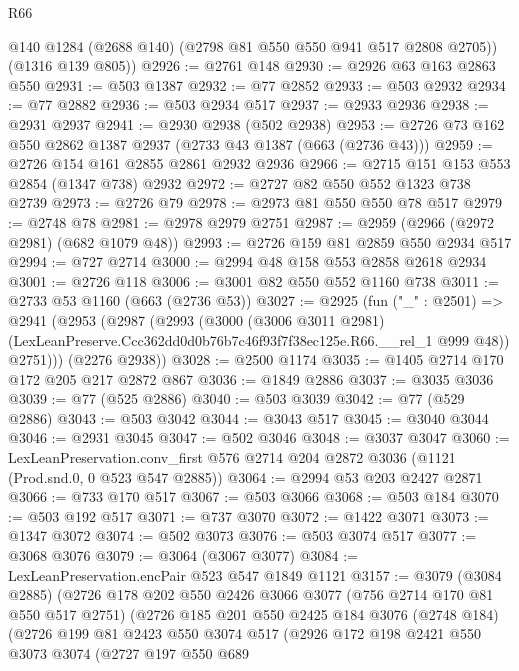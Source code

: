 \begin{lexlean}{R66}
\begin{coremodule}
        @140
        @1284
        (@2688 @140)
        (@2798 @81 @550 @550 @941 @517 @2808 @2705))
      (@1316 @139 @805))
@2926 := @2761 @148
@2930 := @2926 @63 @163 @2863 @550
@2931 := @503 @1387
@2932 := @77 @2852
@2933 := @503 @2932
@2934 := @77 @2882
@2936 := @503 @2934 @517
@2937 := @2933 @2936
@2938 := @2931 @2937
@2941 := @2930 @2938 (@502 @2938)
@2953 := @2726 @73 @162 @550 @2862 @1387 @2937 (@2733 @43 @1387 (@663 (@2736 @43)))
@2959 := @2726 @154 @161 @2855 @2861 @2932 @2936
@2966 := @2715 @151 @153 @553 @2854 (@1347 @738) @2932
@2972 := @2727 @82 @550 @552 @1323 @738 @2739
@2973 := @2726 @79
@2978 := @2973 @81 @550 @550 @78 @517
@2979 := @2748 @78
@2981 := @2978 @2979 @2751
@2987 := @2959 (@2966 (@2972 @2981) (@682 @1079 @48))
@2993 := @2726 @159 @81 @2859 @550 @2934 @517
@2994 := @727 @2714
@3000 := @2994 @48 @158 @553 @2858 @2618 @2934
@3001 := @2726 @118
@3006 := @3001 @82 @550 @552 @1160 @738
@3011 := @2733 @53 @1160 (@663 (@2736 @53))
@3027 := @2925
    (fun ("_" : @2501) =>
    @2941
      (@2953
        (@2987
          (@2993
            (@3000
              (@3006 @3011 @2981)
              (LexLeanPreserve.Ccc362dd0d0b76b7c46f93f7f38ec125e.R66.__rel_1 @999 @48))
            @2751)))
      (@2276 @2938))
@3028 := @2500 @1174
@3035 := @1405 @2714 @170 @172 @205 @217 @2872 @867
@3036 := @1849 @2886
@3037 := @3035 @3036
@3039 := @77 (@525 @2886)
@3040 := @503 @3039
@3042 := @77 (@529 @2886)
@3043 := @503 @3042
@3044 := @3043 @517
@3045 := @3040 @3044
@3046 := @2931 @3045
@3047 := @502 @3046
@3048 := @3037 @3047
@3060 := LexLeanPreservation.conv_first
    @576
    @2714
    @204
    @2872
    @3036
    (@1121 (Prod.snd.{0, 0} @523 @547 @2885))
@3064 := @2994 @53 @203 @2427 @2871
@3066 := @733 @170 @517
@3067 := @503 @3066
@3068 := @503 @184
@3070 := @503 @192 @517
@3071 := @737 @3070
@3072 := @1422 @3071
@3073 := @1347 @3072
@3074 := @502 @3073
@3076 := @503 @3074 @517
@3077 := @3068 @3076
@3079 := @3064 (@3067 @3077)
@3084 := LexLeanPreservation.encPair @523 @547 @1849 @1121
@3157 := @3079
    (@3084 @2885)
    (@2726
      @178
      @202
      @550
      @2426
      @3066
      @3077
      (@756 @2714 @170 @81 @550 @517 @2751)
      (@2726
        @185
        @201
        @550
        @2425
        @184
        @3076
        (@2748 @184)
        (@2726
          @199
          @81
          @2423
          @550
          @3074
          @517
          (@2926
            @172
            @198
            @2421
            @550
            @3073
            @3074
            (@2727
              @197
              @550
              @689

\end{coremodule}
\end{lexlean}
